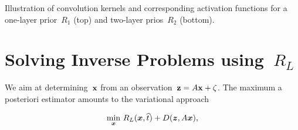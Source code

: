 \documentclass[a1paper,fleqn]{betterportraitposter}
\theoremstyle{plain}
\begin{document}
{\begin{multicols}{2}
\begin{center}
\end{center}
\begin{spacing}{1}
\LARGE
Illustration of convolution kernels and corresponding activation functions for a one-layer prior~$R_1$ (top) and two-layer prios~$R_2$ (bottom).
\end{spacing}

\section{Solving Inverse Problems using~$R_L$}
We aim at determining~${\mathbf{x}}$ from an observation~${\mathbf{z}}=A{\mathbf{x}}+\zeta$.
The maximum a posteriori estimator amounts to the variational approach\\[-1em]
\noindent\begin{minipage}[t]{.59\linewidth}
\vspace{0pt}
\[
\min_{\bm{x}}\, R_L({\bm{x}},\widehat{t}) + D({\bm{z}},A{\bm{x}}),
\]


\end{minipage}
\end{multicols}}
\end{document}
